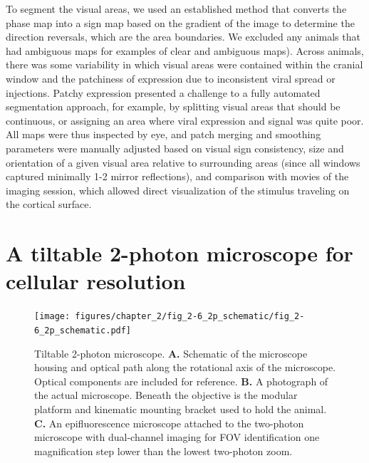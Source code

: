 To segment the visual areas, we used an established method that converts the phase map into a sign map based on the gradient of the image to determine the direction reversals, which are the area boundaries\cite{Garrett2014, Zhuang2017}. We excluded any animals that had ambiguous maps for examples of clear and ambiguous maps). Across animals, there was some variability in which visual areas were contained within the cranial window and the patchiness of expression due to inconsistent viral spread or injections. Patchy expression presented a challenge to a fully automated segmentation approach, for example, by splitting visual areas that should be continuous, or assigning an area where viral expression and signal was quite poor. All maps were thus inspected by eye, and patch merging and smoothing parameters were manually adjusted based on visual sign consistency, size and orientation of a given visual area relative to surrounding areas (since all windows captured minimally 1-2 mirror reflections), and comparison with movies of the imaging session, which allowed direct visualization of the stimulus traveling on the cortical surface. 

\section{A tiltable 2-photon microscope for cellular resolution}

\begin{figure}[t!]
    \texttt{[image: figures/chapter\_2/fig\_2-6\_2p\_schematic/fig\_2-6\_2p\_schematic.pdf]}
    \vspace{.1in}
    \caption[Tilting two-photon microscope]{Tiltable 2-photon microscope. 
    \textbf{A.} Schematic of the microscope housing and optical path along the rotational axis of the microscope. Optical components are included for reference.
    \textbf{B.} A photograph of the actual microscope. Beneath the objective is the modular platform and kinematic mounting bracket used to hold the animal.
    \textbf{C.} An epifluorescence microscope attached to the two-photon microscope with dual-channel imaging for FOV identification one magnification step lower than the lowest two-photon zoom.  
    \label{fig:2p_schematic}}
\end{figure}

